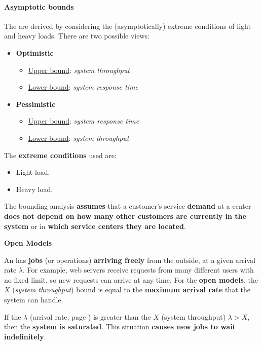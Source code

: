 \newpage

\paragraph{Asymptotic bounds}

The  are derived by considering the (asymptotically) extreme conditions of light and heavy loads. There are two possible views:
\begin{itemize}
	\item \textbf{Optimistic}
	\begin{itemize}
		\item \underline{Upper bound}: \emph{system throughput}
		\item \underline{Lower bound}: \emph{system response time}
	\end{itemize}
	
	\item \textbf{Pessimistic}
	\begin{itemize}
		\item \underline{Upper bound}: \emph{system response time}
		\item \underline{Lower bound}: \emph{system throughput}
	\end{itemize}
\end{itemize}
The \textbf{extreme conditions} used are:
\begin{itemize}
	\item Light load.
	\item Heavy load.
\end{itemize}
The bounding analysis \textbf{assumes} that a customer's service \textbf{demand} at a center \textbf{does not depend on how many other customers are currently in the system} or in \textbf{which service centers they are located}.

\highspace
\begin{flushleft}
	\textcolor{Red2}{\textbf{Open Models}}
\end{flushleft}
An  has \textbf{jobs} (or operations) \textbf{arriving freely} from the outside, at a given arrival rate $\lambda$. For example, web servers receive requests from many different users with no fixed limit, so new requests can arrive at any time. For the \textbf{open models}, the $X$ (\emph{system throughput}) bound is equal to the \textbf{maximum arrival rate} that the system can handle.

\highspace
If the $\lambda$ (arrival rate, page \pageref{eq: arrival rate}) is greater than the $X$ (system throughput) $\lambda > X$, then the \textbf{system is saturated}. This situation \textbf{causes new jobs to wait indefinitely}.

